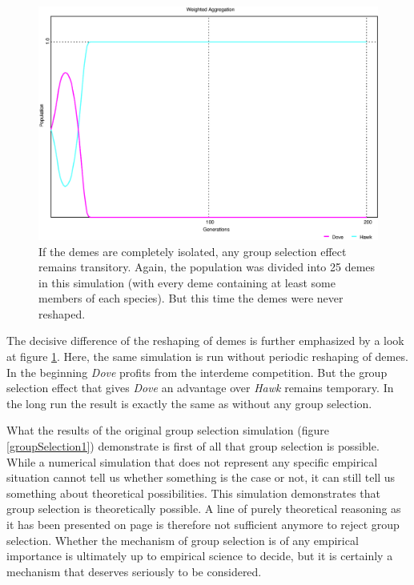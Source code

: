 \begin{figure}
\begin{center}
\includegraphics[width=20cm]{images/group_selection2.eps} %
\caption{\label{groupSelection2} If the demes are completely isolated, any
group selection effect remains transitory. Again, the population was divided
into 25 demes in this simulation (with every deme containing at least some
members of each species). But this time the demes were never reshaped.}
\end{center}
\end{figure}

The decisive difference of the reshaping of demes is further emphasized by a
look at figure \ref{groupSelection2}. Here, the same simulation is run without
periodic reshaping of demes. In the beginning {\em Dove} profits from the
interdeme competition. But the group selection effect that gives {\em Dove}
an advantage over {\em Hawk} remains temporary. In the long run the result is
exactly the same as without any group selection.

What the results of the original group selection simulation (figure
\ref{groupSelection1}) demonstrate is first of all that group selection is
possible. While a numerical simulation that does not represent any specific
empirical situation cannot tell us whether something is the case or not, it
can still tell us something about theoretical possibilities. This simulation
demonstrates that group selection is theoretically possible. A line of purely
theoretical reasoning as it has been presented on page \pageref{againstGS} is
therefore not sufficient anymore to reject group selection. Whether the
mechanism of group selection is of any empirical importance is ultimately
up to empirical science to decide, but it is certainly a mechanism that
deserves seriously to be considered.

